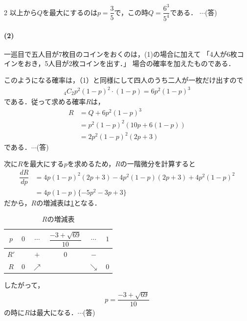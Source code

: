 \documentclass[../../main.tex]{subfiles}
\begin{document}
\begin{multicols}{2}
  以上から$Q$を最大にするのは$p=\dfrac{3}{5}$で，この時$Q=\dfrac{6^3}{5^4}$である． $\cdots$(答)

  \paragraph{(2)}
  一巡目で五人目が$7$枚目のコインをおくのは，(1)の場合に加えて
  「4人が$6$枚コインをおき，5人目が2枚コインを出す．」
  場合の確率を加えたものである．

  このようになる確率は，（1）と同様にして四人のうち二人が一枚だけ出すので
  \begin{align}
    {}_4C_2 p^2 (1-p)^2 \cdot (1-p) = 6p^2(1-p)^3
  \end{align}
  である．従って求める確率$R$は，
  \begin{align}
    R
    & = Q + 6 p^2 (1-p)^3         \\
    & = p^2(1-p)^2 (10p + 6(1-p)) \\
    & = 2p^2(1-p)^2 (2p+3)
  \end{align}
  である．$\cdots$(答)

  次に$R$を最大にする$p$を求めるため，$R$の一階微分を計算すると
  \begin{align}
    \dfrac{dR}{dp}
    & = 4p(1-p)^2(2p+3) - 4p^2(1-p)(2p+3) + 4p^2(1-p)^2 \\
    & = 4p(1-p)\{-5p^2-3p+3\}
  \end{align}
  だから，$R$の増減表は\cref{2000-3:table:1}となる．

  \begin{table}[H]
    \centering
    \caption{$R$の増減表}
    \label{2000-3:table:1}
    \begin{tabular}{|c||c|c|c|c|c|}
      \hline
      $p$  & $0$ & $\cdots$   & $\dfrac{-3+\sqrt{69}}{10}$ & $\cdots$   & $1$ \\
      \hline
      $R'$ &     & $+$        & $0$                       & $-$        &     \\
      \hline
      $R$  & $0$ & $\nearrow$ &                           & $\searrow$ & $0$ \\
      \hline
    \end{tabular}
  \end{table}
  したがって，
  \begin{align}
    p=\dfrac{-3+\sqrt{69}}{10}
  \end{align}
  の時に$R$は最大になる．$\cdots$(答)


\end{multicols}
\end{document}
